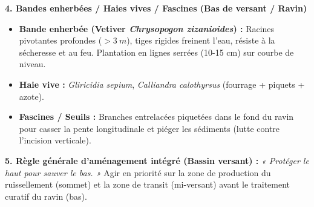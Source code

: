 \documentclass[11pt]{article}
\begin{document}
\begin{aretenir}
\textbf{4. Bandes enherbées / Haies vives / Fascines (Bas de versant / Ravin)}
\begin{itemize}
    \item \textbf{Bande enherbée (Vetiver \emph{Chrysopogon zizanioides}) :} Racines pivotantes profondes ($> \SI{3}{m}$), tiges rigides freinent l'eau, résiste à la sécheresse et au feu. Plantation en lignes serrées (10-15 cm) sur courbe de niveau.
    \item \textbf{Haie vive :} \emph{Gliricidia sepium}, \emph{Calliandra calothyrsus} (fourrage + piquets + azote).
    \item \textbf{Fascines / Seuils :} Branches entrelacées piquetées dans le fond du ravin pour casser la pente longitudinale et piéger les sédiments (lutte contre l'incision verticale).
\end{itemize}

\textbf{5. Règle générale d'aménagement intégré (Bassin versant) :}
\textit{« Protéger le haut pour sauver le bas. »} Agir en priorité sur la zone de production du ruissellement (sommet) et la zone de transit (mi-versant) avant le traitement curatif du ravin (bas).
\end{aretenir}
\end{document}
